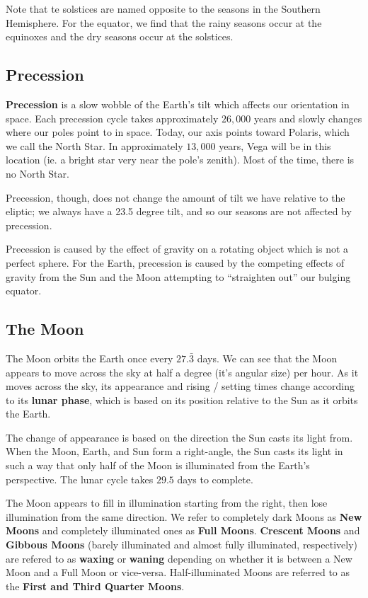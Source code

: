 \documentclass[12pt]{article}
\begin{document}
Note that te solstices are named opposite to the seasons in the Southern Hemisphere. For the equator, we find that the rainy seasons occur at the equinoxes and the dry seasons occur at the solstices.

\subsection{Precession}
{\bf Precession} is a slow wobble of the Earth's tilt which affects our orientation in space. Each precession cycle takes approximately $26,000$ years and slowly changes where our poles point to in space. Today, our axis points toward Polaris, which we call the North Star. In approximately $13,000$ years, Vega will be in this location (ie. a bright star very near the pole's zenith). Most of the time, there is no North Star.

Precession, though, does not change the amount of tilt we have relative to the eliptic; we always have a 23.5 degree tilt, and so our seasons are not affected by precession.

Precession is caused by the effect of gravity on a rotating object which is not a perfect sphere. For the Earth, precession is caused by the competing effects of gravity from the Sun and the Moon attempting to ``straighten out'' our bulging equator.

\subsection{The Moon}
The Moon orbits the Earth once every $27.\bar{3}$ days. We can see that the Moon appears to move across the sky at half a degree (it's angular size) per hour. As it moves across the sky, its appearance and rising / setting times change according to its {\bf lunar phase}, which is based on its position relative to the Sun as it orbits the Earth.

The change of appearance is based on the direction the Sun casts its light from. When the Moon, Earth, and Sun form a right-angle, the Sun casts its light in such a way that only half of the Moon is illuminated from the Earth's perspective. The lunar cycle takes $29.5$ days to complete.

The Moon appears to fill in illumination starting from the right, then lose illumination from the same direction. We refer to completely dark Moons as {\bf New Moons} and completely illuminated ones as {\bf Full Moons}. {\bf Crescent Moons} and {\bf Gibbous Moons} (barely illuminated and almost fully illuminated, respectively) are refered to as {\bf waxing} or {\bf waning} depending on whether it is between a New Moon and a Full Moon or vice-versa. Half-illuminated Moons are referred to as the {\bf First and Third Quarter Moons}.
\end{document}
